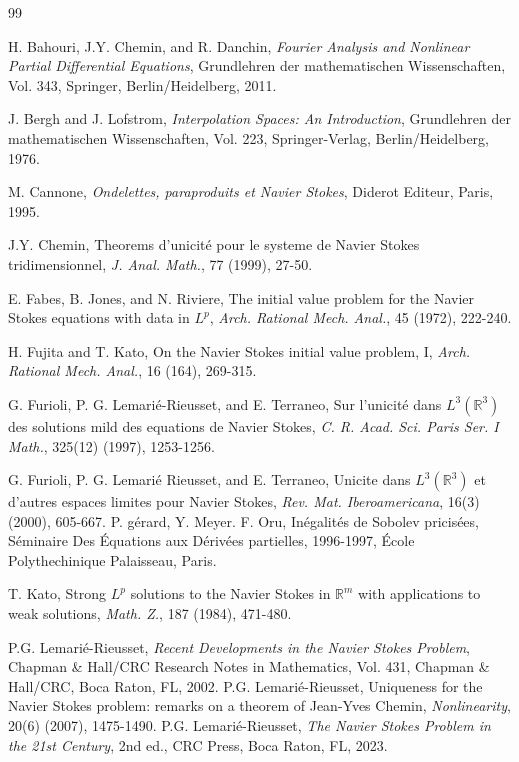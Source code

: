 \documentclass[11pt]{amsart}%
\theoremstyle{plain}
\numberwithin{equation}{section}
\begin{document}
\begin{thebibliography}{99}

 H. Bahouri, J.Y. Chemin, and R. Danchin, \textit{Fourier Analysis and Nonlinear Partial Differential Equations}, Grundlehren der mathematischen Wissenschaften, Vol. 343, Springer, Berlin/Heidelberg, 2011.

 J. Bergh and J. Lofstrom, \textit{Interpolation Spaces: An Introduction}, Grundlehren der mathematischen Wissenschaften, Vol. 223, Springer-Verlag, Berlin/Heidelberg, 1976.

 M. Cannone, \textit{Ondelettes, paraproduits et Navier Stokes}, Diderot Editeur, Paris, 1995.

 J.Y. Chemin, Theorems d'unicit\'e pour le systeme de Navier Stokes tridimensionnel, \textit{J. Anal. Math.}, 77 (1999), 27-50.

 E. Fabes, B. Jones, and N. Riviere, The initial value problem for the Navier Stokes equations with data in $L^p$, \textit{Arch. Rational Mech. Anal.}, 45 (1972), 222-240.

 H. Fujita and T. Kato, On the Navier Stokes initial value problem, I, \textit{Arch. Rational Mech. Anal.}, 16 (164), 269-315.

 G. Furioli, P. G. Lemari\'e-Rieusset, and E. Terraneo, Sur l'unicit\'e dans $L^3(\mathbb{R}^3)$ des solutions mild des equations de Navier Stokes, \textit{C. R. Acad. Sci. Paris Ser. I Math.}, 325(12) (1997), 1253-1256.

 G. Furioli, P. G. Lemari\'e Rieusset, and E. Terraneo, Unicite dans $L^3(\mathbb{R}^3)$ et d'autres espaces limites pour Navier Stokes, \textit{Rev. Mat. Iberoamericana}, 16(3) (2000), 605-667.
 P. g\'erard, Y. Meyer. F. Oru, In\'egalit\'es de Sobolev pricis\'ees, S\'eminaire Des \'Equations aux D\'eriv\'ees partielles, 1996-1997, \'Ecole Polythechinique Palaisseau, Paris.

 T. Kato, Strong $L^p$ solutions to the Navier Stokes in $\mathbb{R}^m$ with applications to weak solutions, \textit{Math. Z.}, 187 (1984), 471-480.

 P.G. Lemari\'e-Rieusset, \textit{Recent Developments in the Navier Stokes Problem}, Chapman \& Hall/CRC Research Notes in Mathematics, Vol. 431, Chapman \& Hall/CRC, Boca Raton, FL, 2002.
 P.G. Lemari\'e-Rieusset, Uniqueness for the Navier Stokes problem: remarks on a theorem of Jean-Yves Chemin, \textit{Nonlinearity}, 20(6) (2007), 1475-1490.
 P.G. Lemari\'e-Rieusset, \textit{The Navier Stokes Problem in the 21st Century}, 2nd ed., CRC Press, Boca Raton, FL, 2023.


\end{thebibliography}
\end{document}
